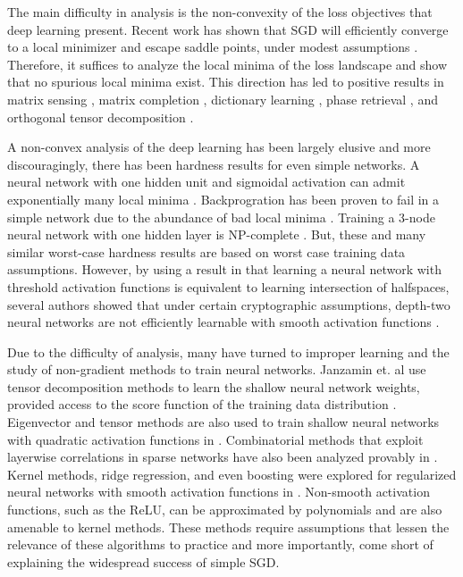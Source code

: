 The main difficulty in analysis is the non-convexity of the loss objectives that deep learning present. Recent work has shown that SGD will efficiently converge to a local minimizer and escape saddle points, under modest assumptions \cite{GeHJY15}. Therefore, it suffices to analyze the local minima of the loss landscape and show that no spurious local minima exist. This direction has led to positive results in matrix sensing \cite{ParkKCS16a}, matrix completion \cite{GeLM16}, dictionary learning \cite{SunQW15}, phase retrieval \cite{SunQW16}, and orthogonal tensor decomposition \cite{GeHJY15}. 

A non-convex analysis of the deep learning has been largely elusive and more discouragingly, there has been hardness results for even simple networks. A neural network with one hidden unit and sigmoidal activation can admit exponentially many local minima \cite{Auer}. Backprogration has been proven to fail in a simple network due to the abundance of bad local minima \cite{brady1989back}. Training a 3-node neural network with one hidden layer is { NP}-complete \cite{BlumR88}.  But, these and many similar worst-case hardness results are based on worst case training data assumptions. However, by using a result in \cite{klivans2006cryptographic} that learning a neural network with threshold activation functions is equivalent to learning intersection of halfspaces, several authors showed that under certain cryptographic assumptions, depth-two neural networks are not efficiently learnable with smooth activation functions \cite{LivniSS14} \cite{ZhangLWJ15}\cite{ZhangLJ15}. 

Due to the difficulty of analysis, many have turned to improper learning and the study of non-gradient methods to train neural networks. Janzamin et. al use tensor decomposition methods to learn the shallow neural network weights, provided access to the score function of the training data distribution \cite{JanzaminSA15}. Eigenvector and tensor methods are also used to train shallow neural networks with quadratic activation functions in \cite{LivniSS14}. Combinatorial methods that exploit layerwise correlations in sparse networks have also been analyzed provably in \cite{AroraBGM13}. Kernel methods, ridge regression, and even boosting were explored for regularized neural networks with smooth activation functions in \cite{shalev2011learning}\cite{ZhangLWJ15}\cite{ZhangLJ15}. Non-smooth activation functions, such as the ReLU, can be approximated by polynomials and are also amenable to kernel methods\cite{GoelKKT16}. These methods require assumptions that lessen the relevance of these algorithms to practice and more importantly, come short of explaining the widespread success of simple SGD.

